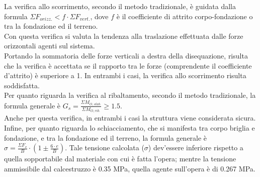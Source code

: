 La verifica allo scorrimento, secondo il metodo tradizionale, è guidata dalla formula $\Sigma F_{orizz.}<f\cdot\Sigma F_{vert.}$, dove $f$ è il coefficiente di attrito corpo-fondazione o tra la fondazione ed il terreno.\\
Con questa verifica si valuta la tendenza alla traslazione effettuata dalle forze orizzontali agenti sul sistema.\\
Portando la sommatoria delle forze verticali a destra della disequazione, risulta che la verifica è accettata se il rapporto tra le forze (comprendente il coefficiente d'attrito) è superiore a 1. In entrambi i casi, la verifica allo scorrimento risulta soddisfatta.\\
Per quanto riguarda la verifica al ribaltamento, secondo il metodo tradizionale, la formula generale è $G_s = \frac{\Sigma M_{O,stab.}}{\Sigma M_{O,rib.}} \ge 1.5$.\\
Anche per questa verifica, in entrambi i casi la struttura viene considerata sicura.\\
Infine, per quanto riguarda lo schiacciamento, che si manifesta tra corpo briglia e fondazione, e tra la fondazione ed il terreno, la formula generale è $\sigma= \frac{\Sigma F_v}{B} \cdot \left(1 \pm \frac{6 \cdot e}{B}\right)$. Tale tensione calcolata ($\sigma$) dev'essere inferiore rispetto a quella sopportabile dal materiale con cui è fatta l'opera; mentre la tensione ammissibile dal calcestruzzo è 0.35 MPa, quella agente sull'opera è di 0.267 MPa.

